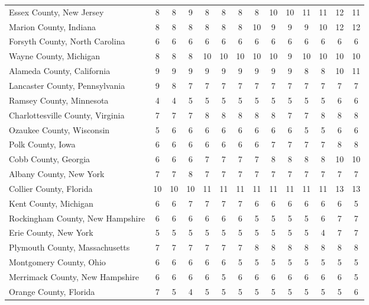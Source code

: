 \begin{landscape}
\begin{longtable}{lccccccccccccc}
	Essex County, New Jersey & 8 & 8 & 9 & 8 & 8 & 8 & 8 & 10 & 10 & 11 & 11 & 12 & 11 \\
	Marion County, Indiana & 8 & 8 & 8 & 8 & 8 & 8 & 10 & 9 & 9 & 9 & 10 & 12 & 12 \\
	Forsyth County, North Carolina & 6 & 6 & 6 & 6 & 6 & 6 & 6 & 6 & 6 & 6 & 6 & 6 & 6 \\
	Wayne County, Michigan & 8 & 8 & 8 & 10 & 10 & 10 & 10 & 10 & 9 & 10 & 10 & 10 & 10 \\
	Alameda County, California & 9 & 9 & 9 & 9 & 9 & 9 & 9 & 9 & 9 & 8 & 8 & 10 & 11 \\
	Lancaster County, Pennsylvania & 9 & 8 & 7 & 7 & 7 & 7 & 7 & 7 & 7 & 7 & 7 & 7 & 7 \\
	Ramsey County, Minnesota & 4 & 4 & 5 & 5 & 5 & 5 & 5 & 5 & 5 & 5 & 5 & 6 & 6 \\
	Charlottesville County, Virginia & 7 & 7 & 7 & 8 & 8 & 8 & 8 & 8 & 7 & 7 & 8 & 8 & 8 \\
	Ozaukee County, Wisconsin & 5 & 6 & 6 & 6 & 6 & 6 & 6 & 6 & 6 & 5 & 5 & 6 & 6 \\
	Polk County, Iowa & 6 & 6 & 6 & 6 & 6 & 6 & 6 & 7 & 7 & 7 & 7 & 8 & 8 \\
	Cobb County, Georgia & 6 & 6 & 6 & 7 & 7 & 7 & 7 & 8 & 8 & 8 & 8 & 10 & 10 \\
	Albany County, New York & 7 & 7 & 8 & 7 & 7 & 7 & 7 & 7 & 7 & 7 & 7 & 7 & 7 \\
	Collier County, Florida & 10 & 10 & 10 & 11 & 11 & 11 & 11 & 11 & 11 & 11 & 11 & 13 & 13 \\
	Kent County, Michigan & 6 & 6 & 7 & 7 & 7 & 7 & 6 & 6 & 6 & 6 & 6 & 6 & 5 \\
	Rockingham County, New Hampshire & 6 & 6 & 6 & 6 & 6 & 6 & 5 & 5 & 5 & 5 & 6 & 7 & 7 \\
	Erie County, New York & 5 & 5 & 5 & 5 & 5 & 5 & 5 & 5 & 5 & 5 & 4 & 7 & 7 \\
	Plymouth County, Massachusetts & 7 & 7 & 7 & 7 & 7 & 7 & 8 & 8 & 8 & 8 & 8 & 8 & 8 \\
	Montgomery County, Ohio & 6 & 6 & 6 & 6 & 6 & 5 & 5 & 5 & 5 & 5 & 5 & 5 & 5 \\
	Merrimack County, New Hampshire & 6 & 6 & 6 & 6 & 5 & 6 & 6 & 6 & 6 & 6 & 6 & 6 & 5 \\
	Orange County, Florida & 7 & 5 & 4 & 5 & 5 & 5 & 5 & 5 & 5 & 5 & 5 & 5 & 6
\end{longtable}


\end{landscape}
